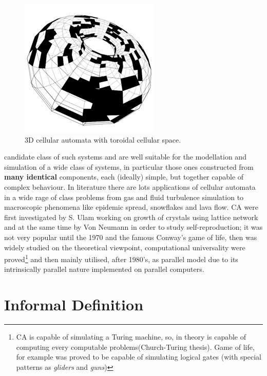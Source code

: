 \begin{figure}
\includegraphics[scale=0.9]{./images/CA_FDM/torus-2}
\caption{3D cellular automata with toroidal cellular space.}\label{torus}
\end{figure}
candidate class of such systems and are well suitable for the modellation and
simulation of a wide class of systems, in particular those ones constructed from
\textbf{many identical} components, each (ideally) simple, but together capable
of complex behaviour\cite{Toffoli1984}\cite{toffoli1987}. In literature there
are lots applications of cellular automata in a wide rage of class problems from
gas\cite{Frisch1986} and fluid turbulence\cite{Succi1991} simulation to
macroscopic phenomena\cite{Gregorio1999} like epidemic
spread\cite{Sirakoulis2000}, snowflakes and lava
flow\cite{Crisci2004}\cite{Spataro2010}.
CA were first investigated by S. Ulam working on growth of crystals using
lattice network and at the same time by Von Neumann in order to study
self-reproduction\cite{Neumann1966}; it was not very popular until the 1970 and
the famous Conway's game of life\cite{Conway1970}, then was widely studied on
the theoretical viewpoint, computational universality were
proved\footnote{CA is capable of simulating a Turing machine, so, in theory is
capable of computing every computable problems(Church-Turing
thesis). Game of life, for example was proved to be capable
of simulating logical gates (with special patterns as
\textit{gliders} and \textit{guns})}\cite{Thatcher1970} and then mainly
utilised, after 1980's, as parallel model due to its intrinsically parallel nature implemented on parallel computers\cite{Margolus1986}.




\section{Informal Definition}

